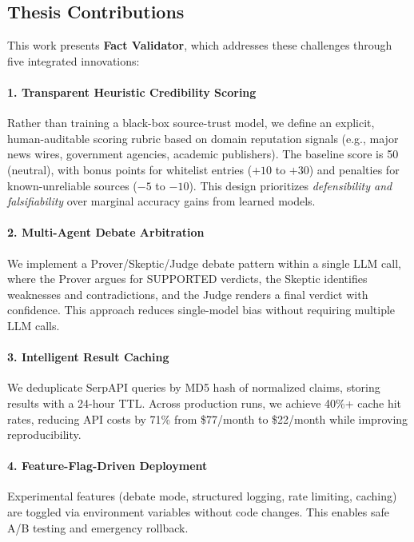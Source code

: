 \documentclass[12pt,a4paper,twoside]{article}
\begin{document}
\subsection{Thesis Contributions}

This work presents \textbf{Fact Validator}, which addresses these challenges through five integrated innovations:

\paragraph{1. Transparent Heuristic Credibility Scoring}
Rather than training a black-box source-trust model, we define an explicit, human-auditable scoring rubric based on domain reputation signals (e.g., major news wires, government agencies, academic publishers). The baseline score is 50 (neutral), with bonus points for whitelist entries ($+10$ to $+30$) and penalties for known-unreliable sources ($-5$ to $-10$). This design prioritizes \textit{defensibility and falsifiability} over marginal accuracy gains from learned models.

\paragraph{2. Multi-Agent Debate Arbitration}
We implement a Prover/Skeptic/Judge debate pattern within a single LLM call, where the Prover argues for SUPPORTED verdicts, the Skeptic identifies weaknesses and contradictions, and the Judge renders a final verdict with confidence. This approach reduces single-model bias without requiring multiple LLM calls.

\paragraph{3. Intelligent Result Caching}
We deduplicate SerpAPI queries by MD5 hash of normalized claims, storing results with a 24-hour TTL. Across production runs, we achieve 40\%+ cache hit rates, reducing API costs by 71\% from \$77/month to \$22/month while improving reproducibility.

\paragraph{4. Feature-Flag-Driven Deployment}
Experimental features (debate mode, structured logging, rate limiting, caching) are toggled via environment variables without code changes. This enables safe A/B testing and emergency rollback.
\end{document}

